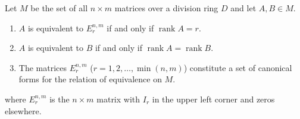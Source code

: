 Let $M$ be the set of all $n \times m$ matrices over a division ring $D$ and let $A, B \in M$.
\begin{enumerate}
\item $A$ is equivalent to $E_r^{n,m}$ if and only if $\operatorname{rank} A = r$.
\item $A$ is equivalent to $B$ if and only if $\operatorname{rank} A = \operatorname{rank} B$.
\item The matrices $E_r^{n,m}$ ($r = 1, 2, \ldots, \min(n,m)$) constitute a set of canonical forms for the relation of equivalence on $M$.
\end{enumerate}
where $E_r^{n,m}$ is the $n \times m$ matrix with $I_r$ in the upper left corner and zeros elsewhere.
